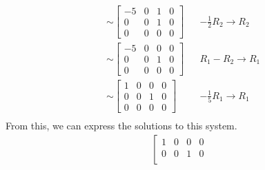 \documentclass[10pt,letterpaper,final]{report}
\newcommand{\reason}[1]{&& \text{#1}}
\begin{document}
\begin{enumerate}[label=(\alph*)]
\begin{enumerate}[label=(\arabic*)]
\begin{align*}
                                                                      & \sim \left[\begin{array}{rrr|r}
                                                                                 -5 & 0 & 1 & 0 \\
                                                                                 0  & 0 & 1 & 0 \\
                                                                                 0  & 0 & 0 & 0
                                                                               \end{array}\right] \reason{$-\frac{1}{2}R_2 \to R_2 $} \\[1ex]
                                                                      & \sim \left[\begin{array}{rrr|r}
                                                                                 -5 & 0 & 0 & 0 \\
                                                                                 0  & 0 & 1 & 0 \\
                                                                                 0  & 0 & 0 & 0
                                                                               \end{array}\right] \reason{$R_1 - R_2 \to R_1 $}       \\[1ex]
                                                                      & \sim \left[\begin{array}{rrr|r}
                                                                                 1 & 0 & 0 & 0 \\
                                                                                 0 & 0 & 1 & 0 \\
                                                                                 0 & 0 & 0 & 0
                                                                               \end{array}\right] \reason{$-\frac{1}{5}R_1 \to R_1 $} \\[1ex]
                \end{align*}
                From this, we can express the solutions to this system.
                \begin{align*}
                  \left[\begin{array}{rrr|r}
                      1 & 0 & 0 & 0 \\
                      0 & 0 & 1 & 0 \\

\end{array}
\end{align*}
\end{enumerate}
\end{enumerate}
\end{document}
